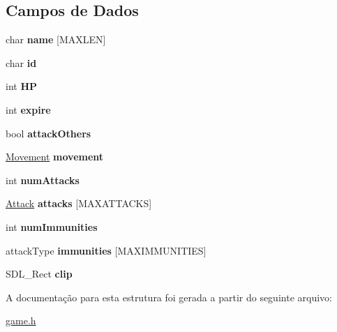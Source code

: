 \subsection*{Campos de Dados}
\begin{DoxyCompactItemize}
\item 
\hypertarget{structobj_a86d156fc82d183ec8f4967283abea2fa}{
char {\bfseries name} \mbox{[}MAXLEN\mbox{]}}
\label{structobj_a86d156fc82d183ec8f4967283abea2fa}

\item 
\hypertarget{structobj_af749ccd9c242573390416d80accd7b39}{
char {\bfseries id}}
\label{structobj_af749ccd9c242573390416d80accd7b39}

\item 
\hypertarget{structobj_a58ca25ca6c9448a364b84539e42f1fa6}{
int {\bfseries HP}}
\label{structobj_a58ca25ca6c9448a364b84539e42f1fa6}

\item 
\hypertarget{structobj_a2f16194304829daa3f050ba49f218b5f}{
int {\bfseries expire}}
\label{structobj_a2f16194304829daa3f050ba49f218b5f}

\item 
\hypertarget{structobj_ac6c1517a5d26b836cf93f7dd26c0269d}{
bool {\bfseries attackOthers}}
\label{structobj_ac6c1517a5d26b836cf93f7dd26c0269d}

\item 
\hypertarget{structobj_af45a8a8dc17b18be6e6a4d951424c4c9}{
\hyperlink{structmov}{Movement} {\bfseries movement}}
\label{structobj_af45a8a8dc17b18be6e6a4d951424c4c9}

\item 
\hypertarget{structobj_a8130237828c5c7edea161ac2642d5b31}{
int {\bfseries numAttacks}}
\label{structobj_a8130237828c5c7edea161ac2642d5b31}

\item 
\hypertarget{structobj_acde888f5f7e2f77fb48eaca6cf2a6dc3}{
\hyperlink{structatt}{Attack} {\bfseries attacks} \mbox{[}MAXATTACKS\mbox{]}}
\label{structobj_acde888f5f7e2f77fb48eaca6cf2a6dc3}

\item 
\hypertarget{structobj_ae3a34d17b75971c48ca48550c1d95b90}{
int {\bfseries numImmunities}}
\label{structobj_ae3a34d17b75971c48ca48550c1d95b90}

\item 
\hypertarget{structobj_a2c4d35a751f31c8e4f8febdc8b141f69}{
attackType {\bfseries immunities} \mbox{[}MAXIMMUNITIES\mbox{]}}
\label{structobj_a2c4d35a751f31c8e4f8febdc8b141f69}

\item 
\hypertarget{structobj_aec06a54fb1cc6faf5a3d3e2232572cc5}{
SDL\_\-Rect {\bfseries clip}}
\label{structobj_aec06a54fb1cc6faf5a3d3e2232572cc5}

\end{DoxyCompactItemize}


A documentação para esta estrutura foi gerada a partir do seguinte arquivo:\begin{DoxyCompactItemize}
\item 
\hyperlink{game_8h}{game.h}\end{DoxyCompactItemize}
